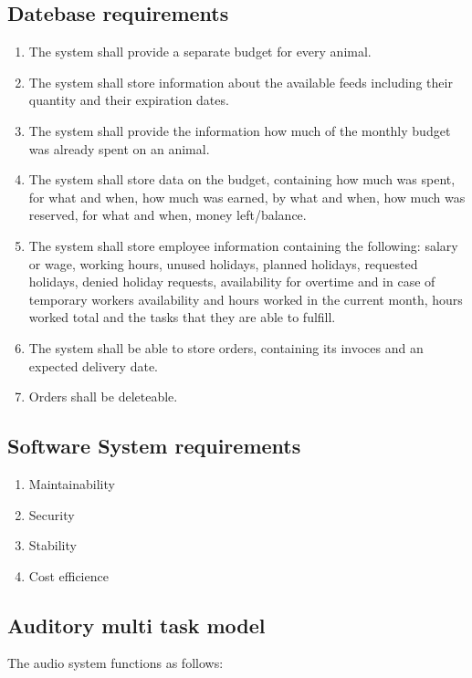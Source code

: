 \subsection{Datebase requirements}
\begin{enumerate}[label*=\arabic*]
		\item The system shall provide a separate budget for every animal.
		\item The system shall store information about the available feeds including their quantity and their expiration dates.
		\item The system shall provide the information how much of the monthly budget was already spent on an animal.
		\item The system shall store data on the budget, containing how much was spent, for what and when, how much was earned, by what and when, how much was reserved, for what and when, money left/balance.
		\item The system shall store employee information containing the following: salary or wage, working hours, unused holidays, planned holidays, requested holidays, denied holiday requests, availability for overtime and in case of temporary workers availability and hours worked in the current month, hours worked total and the tasks that they are able to fulfill.
		\item The system shall be able to store orders, containing its invoces and an expected delivery date.
		\item Orders shall be deleteable.
\end{enumerate}
\subsection{Software System requirements}
\begin{enumerate}[label*=\arabic*]
		\item Maintainability
		\item Security
		\item Stability
		\item Cost efficience
\end{enumerate}


\subsection{Auditory multi task model}

The audio system functions as follows:

